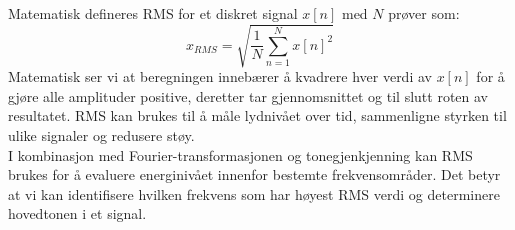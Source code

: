 Matematisk defineres RMS for et diskret signal $x[n]$ med $N$ prøver som:
\[
x_{RMS} = \sqrt{\frac{1}{N} \sum_{n=1}^{N} x[n]^2}
\]
\noindent
Matematisk ser vi at beregningen innebærer å kvadrere hver verdi av $x[n]$ for å gjøre alle amplituder positive, deretter tar gjennomsnittet og til slutt roten av resultatet. RMS kan brukes til å måle lydnivået over tid, sammenligne styrken til ulike signaler og redusere støy. \\
I kombinasjon med Fourier-transformasjonen og tonegjenkjenning kan RMS brukes for å evaluere energinivået innenfor bestemte frekvensområder. Det betyr at vi kan identifisere hvilken frekvens som har høyest RMS verdi og determinere hovedtonen i et signal.
